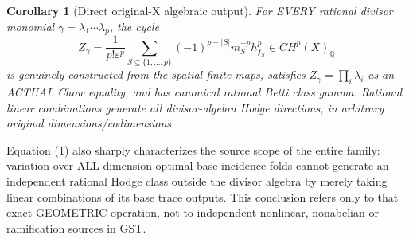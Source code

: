 \documentclass[11pt]{article}
\newtheorem{corollary}{Corollary}
\begin{document}
\begin{corollary}[Direct original-X algebraic output]
For EVERY rational divisor monomial
$\gamma=\lambda_1\cdots\lambda_p$, the cycle
\[
 Z_\gamma=\frac{1}{p!\varepsilon^p}
 \sum_{S\subseteq\{1,\ldots,p\}}
 (-1)^{p-|S|}m_S^{-p}h_{f_S}^p
       \in CH^p(X)_{\mathbb Q}                             \tag{3}
\]
is genuinely constructed from the spatial finite maps,
satisfies $Z_\gamma=\prod_i\lambda_i$ as an
ACTUAL Chow equality, and has canonical rational
Betti class gamma. Rational linear combinations
generate all divisor-algebra Hodge directions,
in arbitrary original dimensions/codimensions.
\end{corollary}

Equation (1) also sharply characterizes the source
scope of the entire family: variation over ALL
dimension-optimal base-incidence folds cannot
generate an independent rational Hodge class
outside the divisor algebra by merely taking
linear combinations of its base trace outputs.
This conclusion refers only to that exact
GEOMETRIC operation, not to independent nonlinear,
nonabelian or ramification sources in GST.
\end{document}
